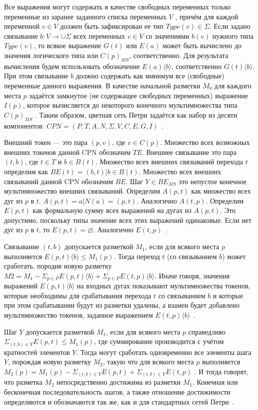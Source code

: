Все выражения могут содержать в качестве свободных переменных только переменные из заранее заданного списка переменных $V$ , причём для каждой переменной $v \in V$ должен быть зафиксирован ее тип $Type(v) \in \Sigma$. Если задано связывание $b : V  \rightarrow \cup \Sigma$ всех переменных $v \in V$ со значениями $b(v)$ нужного типа $Type(v)$, то всякое выражение $G(t)$ или $E(a)$ может быть вычислено до значения логического типа или $C(p)_{MS}$, соответственно. Для результата вычисления будем использовать обозначение $E(a) \langle b \rangle$, соответственно $G(t) \langle b \rangle$. При этом связывание $b$ должно содержать как минимум все (свободные) переменные данного выражения. В качестве начальной разметки $M_0$ для каждого места $p$ задаётся замкнутое (не содержащее свободных переменных) выражение $I(p)$, которое вычисляется до некоторого конечного мультимножества типа $C(p)_{MS}$ . Таким образом, цветная сеть Петри задаётся как набор из десяти компонентов: $CPN = (P, T, A, N, \Sigma, V, C, E, G, I)$~\cite{cpn}.

Внешний токен --- это пара $(p, v)$, где $v \in C(p)$. Множество всех возможных внешних токенов данной CPN обозначим $TE$. Внешнее связывание это пара $(t, b)$, где $t \in T$ и $b \in B(t)$. Множество всех внешних связываний перехода $t$ определим как $BE(t) = {(b, t)|b \in B(t)}$. Множество всех внешних связываний данной CPN обозначим $BE$. Шаг $Y \in BE_{MS}$ это непустое конечное мультимножество внешних
связываний. Определим $A(p, t)$ как множество всех дуг из $p$ в $t$. $A(p, t) = {a|N(a) = (p, t)}$. Аналогично $A(t, p)$. Определим $E(p, t)$ как формальную сумму всех выражений на дугах из $A(p, t)$. Это допустимо, поскольку типы значение всех этих выражений одинаковые. Если нет дуг из $p$ в $t$, то $E(p, t) = \varnothing$. Аналогично $E(t, p)$~\cite{cpn}.

Связывание $(t, b)$ допускается разметкой $M_1$, если для всякого места $p$ выполняется $E(p, t) \langle b \rangle  \leq M_1(p)$. Тогда переход $t$ (со связыванием $b$) может сработать, породив новую разметку $M2 = M_1 - \Sigma_ {p \in P} E(p, t) \langle b \rangle + \Sigma_{p \in P} E(t, p)\langle b \rangle$. Иначе говоря, значения выражений $E(p, t) \langle b \rangle$ на входных дугах показывают мультимножества токенов, которые необходимы для срабатывания перехода $t$ со связыванием $b$ и которые при этом срабатывании будут из разметки удалены, а взамен будет добавлено мультимножество токенов, заданное выражением $E(t, p) \langle b \rangle$~\cite{cpn}.

Шаг $Y$ допускается разметкой $M_1$, если для всякого места $p$ справедливо $\Sigma_{(t,b) \in Y} E(p, t) \leq M_1(p)$, где суммирование производится с учётом кратностей элементов $Y$. Тогда могут сработать одновременно все элементы шага $Y$, порождая новую разметку $M_2$, такую что для всякого места $p$ выполняется $M_2(p) = M_1(p) - \Sigma_{(t,b) \in Y} E(p, t) + \Sigma_{(t,b) \in Y} E(t, p)$
. И тогда говорят, что разметка $M_2$ непосредственно достижима из разметки $M_1$. Конечная или бесконечная последовательность шагов, а также отношение достижимости определяются и обозначаются так же, как и для стандартных сетей Петри~\cite{cpn}.

